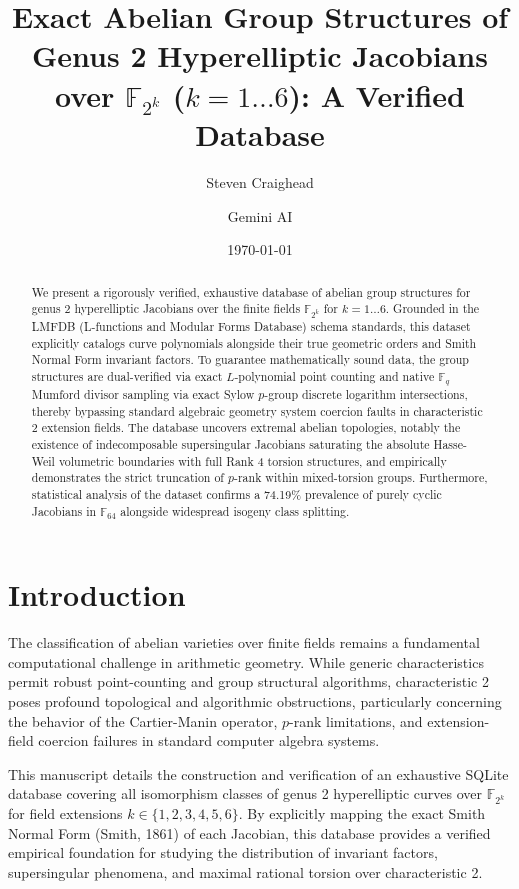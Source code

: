 \documentclass[letterpaper, 11pt]{article}
\title{Exact Abelian Group Structures of Genus 2 Hyperelliptic Jacobians over $\mathbb{F}_{2^k}$ ($k=1 \dots 6$): A Verified Database}
\author{Steven Craighead \and Gemini AI}
\date{\today}
\begin{document}
\maketitle

\begin{abstract}
We present a rigorously verified, exhaustive database of abelian group structures for genus 2 hyperelliptic Jacobians over the finite fields $\mathbb{F}_{2^k}$ for $k=1 \dots 6$. Grounded in the LMFDB (L-functions and Modular Forms Database) schema standards, this dataset explicitly catalogs curve polynomials alongside their true geometric orders and Smith Normal Form invariant factors. To guarantee mathematically sound data, the group structures are dual-verified via exact $L$-polynomial point counting and native $\mathbb{F}_q$ Mumford divisor sampling via exact Sylow $p$-group discrete logarithm intersections, thereby bypassing standard algebraic geometry system coercion faults in characteristic 2 extension fields. The database uncovers extremal abelian topologies, notably the existence of indecomposable supersingular Jacobians saturating the absolute Hasse-Weil volumetric boundaries with full Rank 4 torsion structures, and empirically demonstrates the strict truncation of $p$-rank within mixed-torsion groups. Furthermore, statistical analysis of the dataset confirms a 74.19\% prevalence of purely cyclic Jacobians in $\mathbb{F}_{64}$ alongside widespread isogeny class splitting.
\end{abstract}

\section{Introduction}
The classification of abelian varieties over finite fields remains a fundamental computational challenge in arithmetic geometry. While generic characteristics permit robust point-counting and group structural algorithms, characteristic 2 poses profound topological and algorithmic obstructions, particularly concerning the behavior of the Cartier-Manin operator, $p$-rank limitations, and extension-field coercion failures in standard computer algebra systems. 

This manuscript details the construction and verification of an exhaustive SQLite database covering all isomorphism classes of genus 2 hyperelliptic curves over $\mathbb{F}_{2^k}$ for field extensions $k \in \{1, 2, 3, 4, 5, 6\}$. By explicitly mapping the exact Smith Normal Form (Smith, 1861) of each Jacobian, this database provides a verified empirical foundation for studying the distribution of invariant factors, supersingular phenomena, and maximal rational torsion over characteristic 2.
\end{document}

